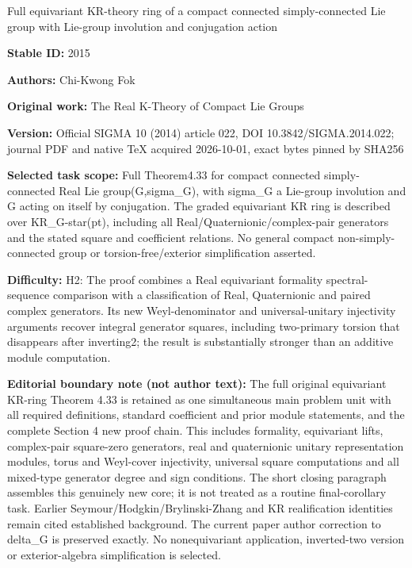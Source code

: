 \documentclass[11pt]{article}
\numberwithin{equation}{section}
\begin{document}
\begin{center}\Large Full equivariant KR-theory ring of a compact connected simply-connected Lie group with Lie-group involution and conjugation action\end{center}
\noindent\textbf{Stable ID:} 2015\par
\noindent\textbf{Authors:} Chi-Kwong Fok\par
\noindent\textbf{Original work:} The Real K-Theory of Compact Lie Groups\par
\noindent\textbf{Version:} Official SIGMA 10 (2014) article 022, DOI 10.3842/SIGMA.2014.022; journal PDF and native TeX acquired 2026-10-01, exact bytes pinned by SHA256\par
\noindent\textbf{Selected task scope:} Full Theorem4.33 for compact connected simply-connected Real Lie group(G,sigma\_G), with sigma\_G a Lie-group involution and G acting on itself by conjugation. The graded equivariant KR ring is described over KR\_G-star(pt), including all Real/Quaternionic/complex-pair generators and the stated square and coefficient relations. No general compact non-simply-connected group or torsion-free/exterior simplification asserted.\par
\noindent\textbf{Difficulty:} H2: The proof combines a Real equivariant formality spectral-sequence comparison with a classification of Real, Quaternionic and paired complex generators. Its new Weyl-denominator and universal-unitary injectivity arguments recover integral generator squares, including two-primary torsion that disappears after inverting2; the result is substantially stronger than an additive module computation.\par
\noindent\textbf{Editorial boundary note (not author text):} The full original equivariant KR-ring Theorem 4.33 is retained as one simultaneous main problem unit with all required definitions, standard coefficient and prior module statements, and the complete Section 4 new proof chain. This includes formality, equivariant lifts, complex-pair square-zero generators, real and quaternionic unitary representation modules, torus and Weyl-cover injectivity, universal square computations and all mixed-type generator degree and sign conditions. The short closing paragraph assembles this genuinely new core; it is not treated as a routine final-corollary task. Earlier Seymour/Hodgkin/Brylinski-Zhang and KR realification identities remain cited established background. The current paper author correction to delta\_G is preserved exactly. No nonequivariant application, inverted-two version or exterior-algebra simplification is selected.\par
\end{document}
